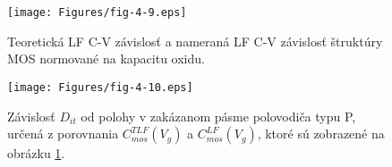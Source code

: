 \begin{figure}[h!]\centering
\texttt{[image: Figures/fig-4-9.eps]}
\captionsetup{justification=raggedright, singlelinecheck=false}
\caption[Teoretická LF C-V závislosť a nameraná LF C-V
  závislosť]{Teoretická LF C-V závislosť a nameraná LF C-V závislosť
  štruktúry MOS normované na kapacitu oxidu.}
\label{fig:4.9}
\end{figure}

\begin{figure}[h!]\centering
\texttt{[image: Figures/fig-4-10.eps]}
\captionsetup{justification=raggedright, singlelinecheck=false}
\caption[Závislosť $D_{it}$ od polohy v zakázanom pásme polovodiča
  určená z porovnania $C_{mos}^{TLF}(V_{g})$ a
  $C_{mos}^{LF}(V_{g})$]{Závislosť $D_{it}$ od polohy v zakázanom
  pásme polovodiča typu P, určená z porovnania $C_{mos}^{TLF}(V_{g})$
  a $C_{mos}^{LF}(V_{g})$, ktoré sú zobrazené na obrázku
  \ref{fig:4.9}.}
\label{fig:4.10}
\end{figure}


